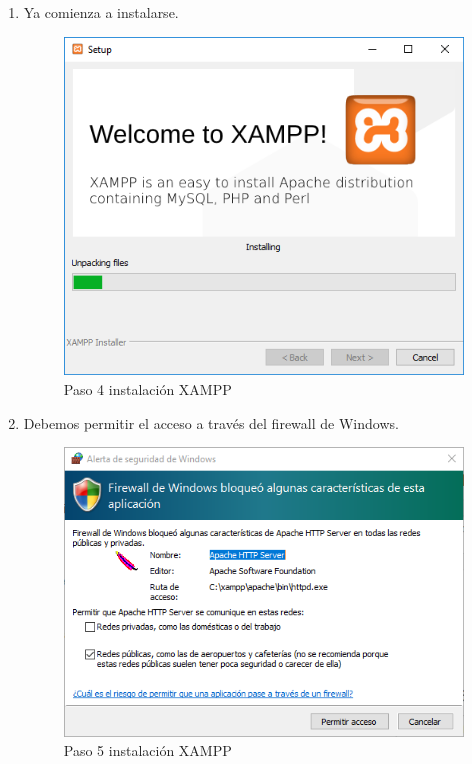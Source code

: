 \begin{enumerate}
	\item Ya comienza a instalarse.
	
	\begin{figure}[H] %
		\centering
		\includegraphics[scale=0.4]{pics/xampp5}  %
		\caption{Paso 4 instalación XAMPP} \label{fig:XAMP5}
	\end{figure}
	
	\item Debemos permitir el acceso a través del firewall de Windows.
	
	\begin{figure}[H] %
		\centering
		\includegraphics[scale=0.4]{pics/xampp6}  %
		\caption{Paso 5 instalación XAMPP} \label{fig:XAMP6}
	\end{figure}
	

\end{enumerate}
